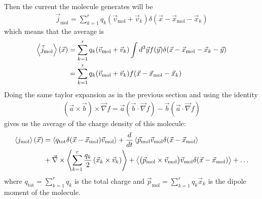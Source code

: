 Then the current the molecule generates will be
\begin{align*}
  \vec{j}_{\text{mol}} = \sum_{k=1}^{r} q_k(\vec{v}_{\text{mol}} + \vec{v}_k) \delta(\vec{x} - \vec{x}_{\text{mol}} - \vec{x}_k)
\end{align*}
which means that the average is
\begin{align*}
  \left\langle\vec{j}_{\text{mol}}\right\rangle(\vec{x}) 
  &= \sum_{k=1}^{r}q_k(\vec{v}_{\text{mol}} + \vec{v}_k) \int d^{3}\vec{y}f(\vec{y}) \delta(\vec{x} - \vec{x}_{\text{mol}} - \vec{x}_k - \vec{y})\\
  &= \sum_{k=1}^{r}q_k (\vec{v}_{\text{mol}} + \vec{v}_k) f(\vec{x} - \vec{x}_{\text{mol}} - \vec{x}_k)
\end{align*}
Doing the same taylor expansion as in the previous section and using the identity
\begin{align*}
  (\vec{a} \times \vec{b}) \times \vec{\nabla}f = \vec{a}(\vec{b} \cdot \vec{\nabla}f) - \vec{b}(\vec{a} \cdot \vec{\nabla}f)
\end{align*}
gives us the average of the charge density of this molecule:
\begin{align*}
  \left\langle j_{\text{mol}}\right\rangle(\vec{x}) 
  &=
  \left\langle
    q_{\text{tot}} \delta(\vec{x} - \vec{x}_{\text{mol}}) \vec{v}_{\text{mol}}
  \right\rangle
  +
  \frac{d }{d t} \left\langle
    \vec{p}_{\text{mol}} \vec{v}_{\text{mol}}\delta(\vec{x} - \vec{x}_{\text{mol}}
\right\rangle\\
  &+
  \vec{\nabla} \times \left\langle
    \sum_{k=1}^{r} \frac{q_k}{2} \left(
      \vec{x}_k \times \vec{v}_k
    \right)
  \right\rangle
  + \left\langle
    \big(\vec{p}_{\text{mol}} \times \vec{v}_{\text{mol}}\big)
    \vec{v}_{\text{mol}}\delta(\vec{x} - \vec{x}_{\text{mol}})
  \right\rangle
  + \ldots
\end{align*}
where $q_{\text{tot}} = \sum_{k=1}^{r} q_k$ is the total charge and $\vec{p}_{\text{mol}} = \sum_{k=1}^{r}q_k \vec{x}_k$ is the dipole moment of the molecule.

